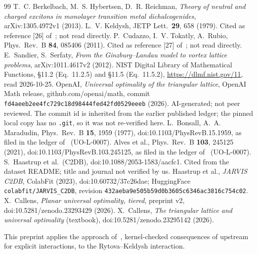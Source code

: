 \documentclass[11pt]{article}
\theoremstyle{remark}
\begin{document}
\begin{thebibliography}{99}\small
{} T.~C. Berkelbach, M.~S. Hybertsen, D.~R. Reichman, \emph{Theory of neutral and charged excitons in
monolayer transition metal dichalcogenides}, arXiv:1305.4972v1 (2013).
 L.~V. Keldysh, JETP Lett.\ \textbf{29}, 658 (1979). Cited as reference [26] of~\cite{bhr}; not read
directly.
 P.~Cudazzo, I.~V. Tokatly, A.~Rubio, Phys.\ Rev.\ B \textbf{84}, 085406 (2011). Cited as reference
[27] of~\cite{bhr}; not read directly.
 E.~Sandier, S.~Serfaty, \emph{From the Ginzburg--Landau model to vortex lattice problems},
arXiv:1011.4617v2 (2012).
 NIST Digital Library of Mathematical Functions, \S11.2 (Eq.~11.2.5) and \S11.5 (Eq.~11.5.2),
\url{https://dlmf.nist.gov/11}, read 2026-10-25.
 OpenAI, \emph{Universal optimality of the triangular lattice}, OpenAI Math release, github.com/openai/math,
commit \texttt{fd4aeeb2ee4fc729c18d98444fed42fd0529eeeb} (2026). AI-generated; not peer reviewed. The commit id is
inherited from the earlier published ledger; the pinned local copy has no \texttt{.git}, so it was not re-verified here.
 L.~Bonsall, A.~A. Maradudin, Phys.\ Rev.\ B \textbf{15}, 1959 (1977), doi:10.1103/PhysRevB.15.1959, as
filed in the ledger of~\cite{uot} (UO-L-0007).
 Alves et al., Phys.\ Rev.\ B \textbf{103}, 245125 (2021), doi:10.1103/PhysRevB.103.245125, as filed in
the ledger of~\cite{uot} (UO-L-0007).
 S.~Haastrup et al.\ (C2DB), doi:10.1088/2053-1583/aacfc1. Cited from the dataset README; title and journal
not verified by us.
 Haastrup et al., \emph{JARVIS C2DB}, ColabFit (2023), doi:10.60732/37c26dae; HuggingFace
\texttt{colabfit/JARVIS\_C2DB}, revision \texttt{432aeba9e505b59d0b3605c6346ac3816c754c02}.
 X.~Callens, \emph{Planar universal optimality, tiered}, preprint v2, doi:10.5281/zenodo.23293429 (2026).
 X.~Callens, \emph{The triangular lattice and universal optimality} (textbook),
doi:10.5281/zenodo.23295142 (2026).
\end{thebibliography}
\noindent This preprint applies the approach of~\cite{uot,txt}, kernel-checked consequences of upstream for explicit interactions, to
the Rytova--Keldysh interaction.
\end{document}
